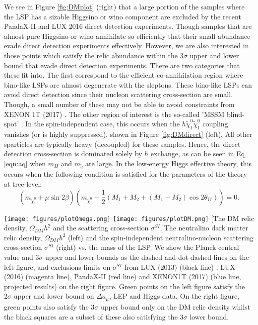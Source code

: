 We see in Figure \ref{fig:DMplot} (right) that a large portion of the samples where the LSP has a sizable Higgsino or wino component are excluded by the recent PandaX-II \cite{RN604} and LUX 2016 \cite{RN605} direct detection experiments. Though samples that are almost pure Higgsino or wino annihilate so efficiently that their small abundance evade direct detection experiments effectively. However, we are also interested in those points which satisfy the relic abundance within the $3\sigma$ upper and lower bound that evade direct detection experiments. There are two categories that these fit into. The first correspond to the efficient co-annihilation region where bino-like LSPs are almost degenerate with the sleptons. These bino-like LSPs can avoid direct detection since their nucleon scattering cross-section are small. Though, a small number of these may not be able to avoid constraints from XENON 1T (2017) \cite{RN606}. The other region of interest is the so-called 'MSSM blind-spot' \cite{RN290,RN281}. In the spin-independent case, this occurs when the $h\tilde{\chi}^0_1 \tilde{\chi}^0_1$ coupling vanishes (or is highly suppressed), shown in Figure \ref{fig:DMdirect} (left). All other sparticles are typically heavy (decoupled) for these samples. Hence, the direct detection cross-section is dominated solely by $h$ exchange, as can be seen in Eq. \ref{eqn:aq} when $m_H$ and $m_{\tilde{q}}$ are large. In the low-energy Higgs effective theory, this occurs when the following condition is satisfied for the parameters of the theory at tree-level:
\begin{equation}
(m_{\tilde{\chi}^0_1}+\mu \sin 2\beta) \left( m_{\tilde{\chi}^0_1} -\frac{1}{2}(M_1+M_2+(M_1-M_2)\cos 2\theta_W )\right)=0.
\end{equation}
\begin{center}
	\texttt{[image: figures/plotOmega.png]}
	\texttt{[image: figures/plotDM.png]}
	[The DM relic density, $\Omega_{DM}h^2$ and the scattering cross-section $\sigma^{SI}$.]{The neutralino dark matter relic density, $\Omega_{DM}h^2$ (left) and the spin-independent neutralino-nucleon scattering cross-section $\sigma^{SI}$ (right) vs. the mass of the LSP. We show the Planck central value and $3\sigma$ upper and lower bounds as the dashed and dot-dashed lines on the left figure, and exclusions limits on $\sigma^{SI}$ from LUX (2013) (black line) \cite{RN176}, LUX (2016) \cite{RN605} (magenta line), PandaX-II \cite{RN604} (red line) and XENON1T (2017) \cite{RN606} (blue line, projected results) on the right figure. Green points on the left figure satisfy the $2\sigma$ upper and lower bound on $\Delta a_{\mu}$, LEP and Higgs data. On the right figure, green points also satisfy the $3\sigma$ upper bound only on the DM relic density whilst the black squares are a subset of these also satisfying the $3\sigma$ lower bound.}
	\label{fig:DMplot}
\end{center}

